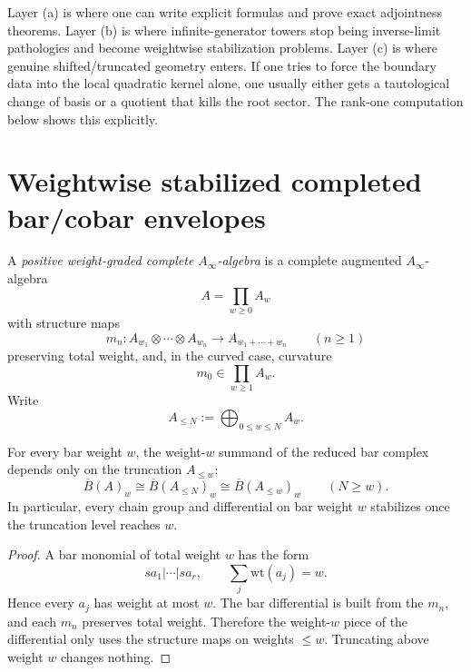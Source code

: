 \begin{remark}
\label{rem:why-the-distinction-matters}
Layer \textup{(a)} is where one can write explicit formulas and prove exact
adjointness theorems.  Layer \textup{(b)} is where infinite-generator towers stop
being inverse-limit pathologies and become weightwise stabilization problems.
Layer \textup{(c)} is where genuine shifted/truncated geometry enters.  If one
tries to force the boundary data into the local quadratic kernel alone, one
usually either gets a tautological change of basis or a quotient that kills the
root sector.  The rank-one computation below shows this explicitly.
\end{remark}

\section{Weightwise stabilized completed bar/cobar envelopes}
\label{sec:weightwise-stabilized}

\begin{definition}
\label{def:positive-weight-complete-ainfty}
A \emph{positive weight-graded complete $A_\infty$-algebra} is a complete
augmented $A_\infty$-algebra
\[
A=\prod_{w\ge 0}A_w
\]
with structure maps
\[
m_n\colon A_{w_1}\otimes\cdots\otimes A_{w_n}\longrightarrow A_{w_1+\cdots+w_n}
\qquad (n\ge 1)
\]
preserving total weight, and, in the curved case, curvature
\[
m_0\in \prod_{w\ge 1} A_w.
\]
Write
\[
A_{\le N}:=\bigoplus_{0\le w\le N}A_w.
\]
\end{definition}

\begin{lemma}
\label{lem:weightwise-stabilization-bar-complex}
For every bar weight $w$, the weight-$w$ summand of the reduced bar complex
depends only on the truncation $A_{\le w}$:
\[
\overline{B}(A)_w\cong \overline{B}(A_{\le N})_w\cong \overline{B}(A_{\le w})_w
\qquad (N\ge w).
\]
In particular, every chain group and differential on bar weight $w$ stabilizes
once the truncation level reaches $w$.
\end{lemma}

\begin{proof}
A bar monomial of total weight $w$ has the form
\[
sa_1|\cdots|sa_r,
\qquad \sum_j \mathrm{wt}(a_j)=w.
\]
Hence every $a_j$ has weight at most $w$.  The bar differential is built from
the $m_n$, and each $m_n$ preserves total weight.  Therefore the weight-$w$
piece of the differential only uses the structure maps on weights $\le w$.
Truncating above weight $w$ changes nothing.
\end{proof}

